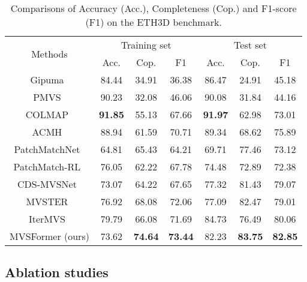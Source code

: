\documentclass[10pt]{article} \usepackage[preprint]{tmlr}
\begin{document}
\begin{table}[h]
\small
\centering
\caption{Comparisons of Accuracy (Acc.), Completeness (Cop.) and F1-score (F1) on the ETH3D benchmark.}\label{tab:eth3d}
\centering
\begin{tabular}{c|ccc|ccc}
\hline 
\multirow{2}{*}{Methods} & \multicolumn{3}{c|}{Training set} & \multicolumn{3}{c}{Test set}\tabularnewline
\cline{2-7} \cline{3-7} \cline{4-7} \cline{5-7} \cline{6-7} \cline{7-7} 
 & Acc. & Cop. & F1 & Acc. & Cop. & F1\tabularnewline
\hline 
Gipuma~\citep{Galliani_2015_ICCV} & 84.44 & 34.91 & 36.38 & 86.47 & 24.91 & 45.18\tabularnewline
PMVS~\citep{furukawa2009accurate} & 90.23 & 32.08 & 46.06 & 90.08 & 31.84 & 44.16\tabularnewline
COLMAP~\citep{schonberger2016pixelwise} & \textbf{91.85} & 55.13 & 67.66 & \textbf{91.97} & 62.98 & 73.01\tabularnewline
ACMH~\citep{xu2019multi} & 88.94 & 61.59 & 70.71 & 89.34 & 68.62 & 75.89\tabularnewline
\hline 
PatchMatchNet~\citep{wang2021patchmatchnet} & 64.81 & 65.43 & 64.21 & 69.71 & 77.46 & 73.12\tabularnewline
PatchMatch-RL~\citep{lee2021patchmatch} & 76.05 & 62.22 & 67.78 & 74.48 & 72.89 & 72.38\tabularnewline
CDS-MVSNet~\citep{giang2021curvature} & 73.07 & 64.22 & 67.65 & 77.32 & 81.43 & 79.07\tabularnewline
MVSTER~\citep{wang2022mvster} & 76.92 & 68.08 & 72.06 & 77.09 & 82.47 & 79.01\tabularnewline
IterMVS~\citep{wang2022itermvs} & 79.79 & 66.08 & 71.69 & 84.73 & 76.49 & 80.06\tabularnewline
\hline
MVSFormer (ours) & 73.62 & \textbf{74.64} & \textbf{73.44} & 82.23  &\textbf{83.75}  & \textbf{82.85} \tabularnewline
\hline 
\end{tabular}
\end{table}


\subsection{Ablation studies}
\label{sec:aba}
\end{document}
